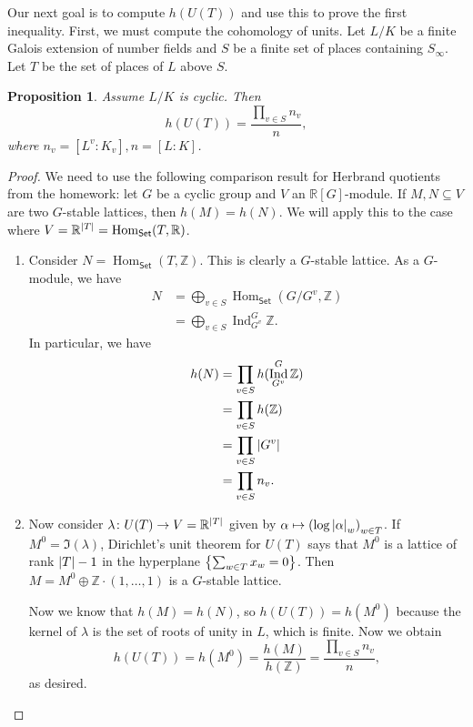 \documentclass[leqno, openany]{memoir}
\newtheorem{prop}[thm]{Proposition}
\theoremstyle{definition}
\theoremstyle{remark}
\theoremstyle{plain}
\theoremstyle{definition}
\theoremstyle{remark}
\newcommand{\R}{\mathbb{R}}
\newcommand{\Z}{\mathbb{Z}}
\newcommand{\ms}[1]{\mathsf{#1}}
\DeclareMathOperator{\Hom}{Hom}
\DeclareMathOperator{\Ind}{Ind}
\begin{document}
Our next goal is to compute $h(U(T))$ and use this to prove the first
inequality. First, we must compute the cohomology of units. Let $L/K$ be a
finite Galois extension of number fields and $S$ be a finite set of places
containing $S_{\infty}$. Let $T$ be the set of places of $L$ above $S$.

\begin{prop} Assume $L/K$ is cyclic. Then \[ h(U(T)) = \frac{\prod_{v \in S}
n_v}{n}, \] where $n_v = [L^v:K_v], n=[L:K]$.  \end{prop}

\begin{proof} We need to use the following comparison result for Herbrand
    quotients from the homework: let $G$ be a cyclic group and $V$ an
    $\R[G]$-module. If $M, N \subseteq V$ are two $G$-stable lattices, then
    $h(M) = h(N)$. We will apply this to the case where $V = \R^{\abs{T}} =
    \Hom_{\ms{Set}}(T, \R)$.  \begin{enumerate} \item Consider $N =
        \Hom_{\ms{Set}}(T, \Z)$. This is clearly a $G$-stable lattice. As a
        $G$-module, we have \begin{align*} N &= \bigoplus_{v \in S}
            \Hom_{\ms{Set}}(G/G^v, \Z) \\ &= \bigoplus_{v \in S} \Ind_{G^v}^G
            \Z.  \end{align*} In particular, we have \begin{align*} h(N) &=
        \prod_{v \in S} h(\Ind_{G^v}^G \Z) \\ &= \prod_{v \in S} h(\Z) \\ &=
    \prod_{v \in S} \abs{G^v} \\ &= \prod_{v \in S} n_v.  \end{align*} \item
    Now consider $\lambda \colon U(T) \to V = \R^{\abs{T}}$ given by $\alpha
    \mapsto {(\log \abs{\alpha}_w)}_{w \in T}$. If $M^0 = \Im(\lambda)$,
    Dirichlet's unit theorem for $U(T)$ says that $M^0$ is a lattice of rank
    $\abs{T} - 1$ in the hyperplane $\qty{\sum_{w \in T} x_w = 0}$. Then $M =
    M^0 \oplus \Z \cdot (1, \ldots, 1)$ is a $G$-stable lattice.

            Now we know that $h(M) = h(N)$, so $h(U(T)) = h(M^0)$ because the
            kernel of $\lambda$ is the set of roots of unity in $L$, which is
            finite. Now we obtain \[ h(U(T)) = h(M^0) = \frac{h(M)}{h(\Z)} =
            \frac{\prod_{v \in S} n_v}{n}, \] as desired. \qedhere
    \end{enumerate} \end{proof}
\end{document}
